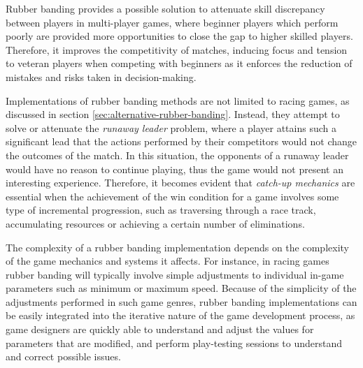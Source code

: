 Rubber banding provides a possible solution to attenuate skill discrepancy between players in multi-player games, where beginner players which perform poorly are provided more opportunities to close the gap to higher skilled players.  Therefore, it improves the competitivity of matches, inducing focus and tension to veteran players when competing with beginners as it enforces the reduction of mistakes and risks taken in decision-making.

Implementations of rubber banding methods are not limited to racing games, as discussed in section \ref{sec:alternative-rubber-banding}. Instead, they attempt to solve or attenuate the \emph{runaway leader} problem, where a player attains such a significant lead that the actions performed by their competitors would not change the outcomes of the match. In this situation, the opponents of a runaway leader would have no reason to continue playing, thus the game would not present an interesting experience. Therefore, it becomes evident that \emph{catch-up mechanics} are essential when the achievement of the win condition for a game involves some type of incremental progression, such as traversing through a race track, accumulating resources or achieving a certain number of eliminations. 

The complexity of a rubber banding implementation depends on the complexity of the game mechanics and systems it affects. For instance, in racing games rubber banding will typically involve simple adjustments to individual in-game parameters such as minimum or maximum speed. Because of the simplicity of the adjustments performed in such game genres, rubber banding implementations can be easily integrated into the iterative nature of the game development process, as game designers are quickly able to understand and adjust the values for parameters that are modified, and perform play-testing sessions to understand and correct possible issues.

